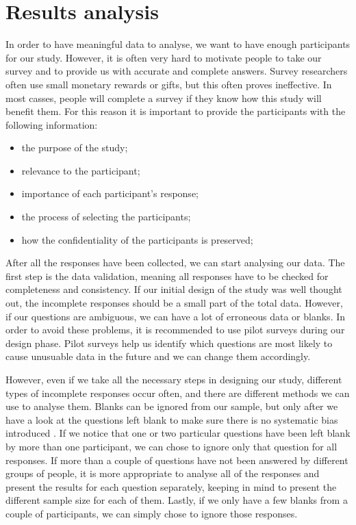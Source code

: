 \documentclass{report}
\begin{document}
\chapter{Results analysis}
In order to have meaningful data to analyse, we want to have enough participants for our study. However, it is often very hard to motivate people to take our survey and to provide us with accurate and complete answers. Survey researchers often use small monetary rewards or gifts, but this often proves ineffective. In most casses, people will complete a survey if they know how this study will benefit them. For this reason it is important to provide the participants with the following information\cite{Kitchenham4}:
\begin{itemize}
\item the purpose of the study;\\
\item relevance to the participant;\\
\item importance of each participant's response;\\
\item the process of selecting the participants;\\
\item how the confidentiality of the participants is preserved;\\
\end{itemize}

After all the responses have been collected, we can start analysing our data. The first step is the data validation, meaning all responses have to be checked for completeness and consistency. If our initial design of the study was well thought out, the incomplete responses should be a small part of the total data. However, if our questions are ambiguous, we can have a lot of erroneous data or blanks. In order to avoid these problems, it is recommended to use pilot surveys during our design phase. Pilot surveys help us identify which questions are most likely to cause unusuable data in the future and we can change them accordingly. 

However, even if we take all the necessary steps in designing our study, different types of incomplete responses occur often, and there are different methods we can use to analyse them. Blanks can be ignored from our sample, but only after we have a look at the questions left blank to make sure there is no systematic bias introduced \cite{Kitchenham6}. If we notice that one or two particular questions have been left blank by more than one participant, we can chose to ignore only that question for all responses. If more than a couple of questions have not been answered by different groups of people, it is more appropriate to analyse all of the responses and present the results for each question separately, keeping in mind to present the different sample size for each of them. Lastly, if we only have a few blanks from a couple of participants, we can simply chose to ignore those responses.
\end{document}
